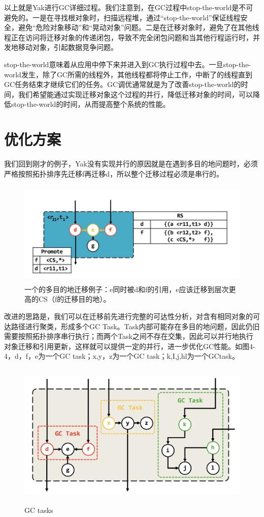 以上就是Yak进行GC详细过程。我们注意到，在GC过程中stop-the-world是不可避免的。一是在寻找根对象时，扫描远程堆，通过“stop-the-world”保证线程安全，避免“危险对象移动”和“晃动对象”问题。二是在迁移对象时，避免了在其他线程正在访问将迁移对象的传递闭包，导致不完全闭包问题和当其他行程运行时，并发地移动对象，引起数据竞争问题。

stop-the-world意味着从应用中停下来并进入到GC执行过程中去。一旦stop-the-world发生，除了GC所需的线程外，其他线程都将停止工作，中断了的线程直到GC任务结束才继续它们的任务。GC调优通常就是为了改善stop-the-world的时间，我们希望能通过实现迁移对象这个过程的并行，降低迁移对象的时间，可以降低stop-the-world的时间，从而提高整个系统的性能。


\section{优化方案}

我们回到刚才的例子，Yak没有实现并行的原因就是在遇到多目的地问题时，必须严格按照拓扑排序先迁移f再迁移d，所以整个迁移过程必须是串行的。
\begin{figure}[H]
    \centering
    \includegraphics[width=12cm,height=5cm]{figure/n1.png}
    \caption{
        一个的多目的地迁移例子：e同时被d和f的引用，e应该迁移到层次更高的CS（f的迁移目的地）。
    }
    \label{snapshot}
\end{figure}
改进的思路是，我们可以在迁移前先进行完整的可达性分析，对含有相同对象的可达路径进行聚类，形成多个GC Task。Task内部可能存在多目的地问题，因此仍旧需要按照拓扑排序串行执行；而两个Task之间不存在交集，因此可以并行地执行对象迁移和引用更新，这样就可以提供一定的并行，进一步优化GC性能。如图4-4，d，f，e为一个GC task；x,y，z为一个GC task；k,I,j,hl为一个GCtask。

\begin{figure}[H]
    \centering
    \includegraphics[width=12cm,height=7cm]{figure/n2.jpeg}
    \caption{
        GC tasks
    }
    \label{snapshot}
\end{figure}



